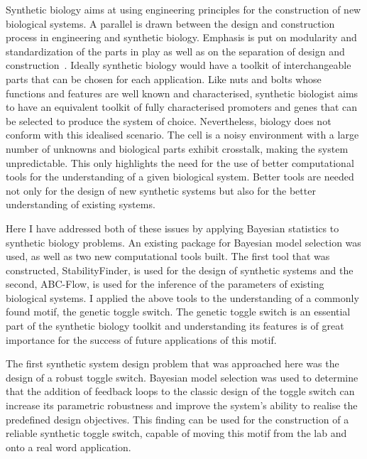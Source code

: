 




Synthetic biology aims at using engineering principles for the construction of new biological systems. A parallel is drawn between the design and construction process in engineering and synthetic biology. Emphasis is put on modularity and standardization of the parts in play as well as on the separation of design and construction~\autocite{Agapakis:2009bt}. Ideally synthetic biology would have a toolkit of interchangeable parts that can be chosen for each application. Like nuts and bolts whose functions and features are well known and characterised, synthetic biologist aims to have an equivalent toolkit of fully characterised promoters and genes that can be selected to produce the system of choice. Nevertheless, biology does not conform with this idealised scenario. The cell is a noisy environment with a large number of unknowns and biological parts exhibit crosstalk, making the system unpredictable. This only highlights the need for the use of better computational tools for the understanding of a given biological system. Better tools are needed not only for the design of new synthetic systems but also for the better understanding of existing systems.     

Here I have addressed both of these issues by applying Bayesian statistics to synthetic biology problems. An existing package for Bayesian model selection was used, as well as two new computational tools built. The first tool that was constructed, StabilityFinder, is used for the design of synthetic systems and the second, ABC-Flow, is used for the inference of the parameters of existing biological systems. I applied the above tools to the understanding of a commonly found motif, the genetic toggle switch. The genetic toggle switch is an essential part of the synthetic biology toolkit and understanding its features is of great importance for the success of future applications of this motif. 

The first synthetic system design problem that was approached here was the design of a robust toggle switch. Bayesian model selection was used to determine that the addition of feedback loops to the classic design of the toggle switch can increase its parametric robustness and improve the system's ability to realise the predefined design objectives. This finding can be used for the construction of a reliable synthetic toggle switch, capable of moving this motif from the lab and onto a real word application.   

